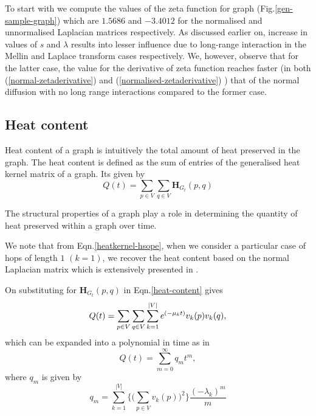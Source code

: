 \documentclass[10pt,a4paper]{article}
\theoremstyle{plain}
\theoremstyle{definition}
\begin{document}
    To start with we compute the values of the zeta function for graph (Fig.\ref{gen-sample-graph}) which are $1.5686$ and $-3.4012$ for the normalised and unnormalised Laplacian matrices respectively. As discussed earlier on, increase in values of $s$ and $\lambda$ results into lesser influence due to long-range interaction in the Mellin and Laplace transform cases respectively. We, however, observe that for the latter case, the value for the derivative of zeta function reaches faster (in both (\ref{normal-zetaderivative}) and (\ref{normalised-zetaderivative}) ) that of the normal diffusion with no long range interactions compared to the former case.     
    
    \subsection{Heat content}
    Heat content of a graph is intuitively the total amount of heat preserved in the graph.
    The heat content is defined as the sum of entries of the generalised heat kernel matrix of a graph. Its given by
    \begin{equation}
    Q(t) = \sum_{p \in V} \sum_{q \in V} \mathbf{H}_{G_t}(p,q)
    \label{heat-content}
    \end{equation}
    
    The structural properties of a graph play a role in determining the quantity of heat preserved within a graph over time.
    
    We note that from Eqn.\ref{heatkernel-hsope}, when we consider a particular case of hops of length $1$ $(k=1)$, we recover the heat content based on the normal Laplacian matrix which is extensively presented in \citep{xiao2009graph}.
    
    On substituting for $\mathbf{H}_{G_t}(p,q)$ in Eqn.\ref{heat-content} gives
    \begin{equation}
    Q(t) = \sum_{p \in V} \sum_{q \in V} \sum_{k=1}^{\arrowvert V\arrowvert} e^{(-\mu_{k} t)} v_{k}(p) v_{k}(q),
    \label{heatcontentdecomp}
    \end{equation}
    which can be expanded into a polynomial in time as in \citep{mcdonald2002diffusions}
    \begin{equation}
    Q(t) = \sum_{m=0}^{\infty} q_m t^m,
    \end{equation}
    where $q_m$ is given by
    \begin{equation}
    q_m  = \sum_{k=1}^{|V|} \Bigg\{ \bigg(\sum_{p\in V}v_{k} (p)\bigg)^2 \Bigg\} \frac{(-\lambda_k)^m}{m}
    \end{equation}
    
\end{document}
